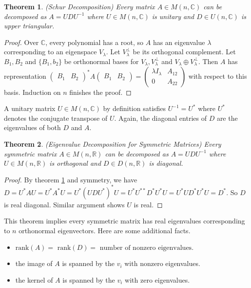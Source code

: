\documentclass[12pt]{amsart}
\newtheorem{theorem}{Theorem}[section]
\theoremstyle{definition}
\begin{document}
\begin{theorem}\label{Schurdecomposition} (Schur Decomposition) Every matrix $A \in M(n, \mathbb{C})$ can be decomposed as $A = UDU^{-1}$ where $U \in M(n, \mathbb{C})$ is unitary and $D \in U(n, \mathbb{C})$ is upper triangular.
\end{theorem}
\begin{proof} Over $\mathbb{C}$, every polynomial has a root, so $A$ has an eigenvalue $\lambda$ corresponding to an eigenspace $V_{\lambda}$. Let $V_{\lambda}^{\perp}$ be its orthogonal complement. Let $B_1, B_2$ and $\{B_1, b_2\}$ be orthonormal bases for $V_{\lambda}, V_{\lambda}^{\perp}$ and $V_{\lambda} \oplus V_{\lambda}^{\perp}$. Then $A$ has representation $\left(\begin{array}{cc} B_1 & B_2 \end{array}\right)^* A \left(\begin{array}{cc} B_1 & B_2 \end{array}\right) = \left(\begin{array}{cc} \lambda I_{\lambda} & A_{12} \\ 0 & A_{22} \end{array}\right)$ with respect to this basis. Induction on $n$ finishes the proof.
\end{proof}

A unitary matrix $U \in M(n, \mathbb{C})$ by definition satisfies $U^{-1} = U^*$ where $U^*$ denotes the conjugate transpose of $U$. Again, the diagonal entries of $D$ are the eigenvalues of both $D$ and $A$.

\begin{theorem}\label{eigenvaluedecompositionforsymmetricmatrices} (Eigenvalue Decomposition for Symmetric Matrices) Every symmetric matrix $A \in M(n, \mathbb{R})$ can be decomposed as $A = UDU^{-1}$ where $U \in M(n, \mathbb{R})$ is orthogonal and $D \in D(n, \mathbb{R})$ is diagonal.
\end{theorem}
\begin{proof} By theorem \ref{Schurdecomposition} and symmetry, we have $D = U^*AU = U^*A^*U = U^*(UDU^*)^*U = U^*U^{**} D^* U^*U = U^*UD^*U^*U = D^*$. So $D$ is real diagonal. Similar argument shows $U$ is real.
\end{proof}

This theorem implies every symmetric matrix has real eigenvalues corresponding to $n$ orthonormal eigenvectors. Here are some additional facts.
\begin{itemize}
\item $\text{rank}(A) = \text{ rank}(D) = \text{ number of nonzero eigenvalues}$.
\item the image of $A$ is spanned by the $v_i$ with nonzero eigenvalues.
\item the kernel of $A$ is spanned by the $v_i$ with zero eigenvalues.
\end{itemize}
\end{document}
